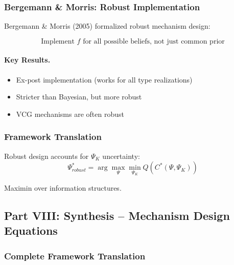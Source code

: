 \subsubsection{Bergemann \& Morris: Robust Implementation}

Bergemann \& Morris (2005) formalized robust mechanism design:

\begin{equation}
\boxed{
\text{Implement } f \text{ for all possible beliefs, not just common prior}
}
\label{eq:robust}
\end{equation}

\paragraph{Key Results.}
\begin{itemize}
    \item Ex-post implementation (works for all type realizations)
    \item Stricter than Bayesian, but more robust
    \item VCG mechanisms are often robust
\end{itemize}

\subsubsection{Framework Translation}

Robust design accounts for $\Psi_K$ uncertainty:
\begin{equation}
\Psi^*_{robust} = \arg\max_{\Psi} \min_{\Psi_K} Q(C^*(\Psi, \Psi_K))
\end{equation}

Maximin over information structures.

\subsection{Part VIII: Synthesis – Mechanism Design Equations}

\subsubsection{Complete Framework Translation}

